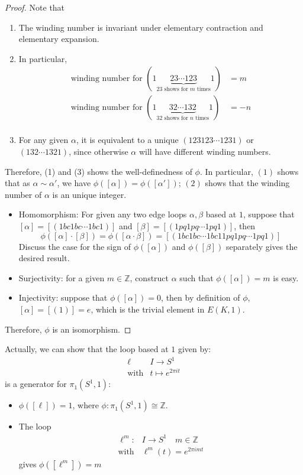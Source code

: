 \begin{proof}
Note that
\begin{enumerate}
\item
The winding number is invariant under elementary contraction and elementary expansion.
\item
In particular,
\begin{align*}
\text{winding number for }(1\underbrace{23\cdots123}_{23 \text{ shows for $m$ times}}1)&=m\\
\text{winding number for }(1\underbrace{32\cdots132}_{32 \text{ shows for $n$ times}}1)&=-n\\
\end{align*}
\item
For any given $\alpha$, it is equivalent to a unique $(123123\cdots1231)$ or $(132\cdots1321)$, since otherwise $\alpha$ will have different winding numbers.
\end{enumerate}
Therefore, (1) and (3) shows the well-definedness of $\phi$. In particular, $(1)$ shows that as $\alpha\sim\alpha'$, we have $\phi([\alpha])=\phi([\alpha'])$; $(2)$ shows that the winding number of $\alpha$ is an unique integer.
\begin{itemize}
\item
Homomorphism:
For given any two edge loops $\alpha,\beta$ based at $1$, suppose that $[\alpha]=[(1bc1bc\cdots1bc1)]$ and $[\beta]=[(1pq1pq\cdots1pq1)]$, then
\[
\phi([\alpha]\cdot[\beta])=\phi([\alpha\cdot\beta])
=
[(1bc1bc\cdots1bc11pq1pq\cdots1pq1)]
\]
Discuss the case for the sign of $\phi([\alpha])$ and $\phi([\beta])$ separately gives the desired result.
\item
Surjectivity:
for a given $m\in\mathbb{Z}$,
construct $\alpha$ such that $\phi([\alpha])=m$ is easy.
\item
Injectivity:
suppose that $\phi([\alpha])=0$, then by definition of $\phi$, $[\alpha]=[(1)]=e$, which is the trivial element in $E(K,1)$.
\end{itemize}
Therefore, $\phi$ is an isomorphism.
\end{proof}

\begin{remark}
Actually, we can show that the loop based at $1$ given by:
\[
\begin{array}{ll}
\ell&I\to S^1\\\text{with}&t\mapsto e^{2\pi i t}
\end{array}
\]
is a generator for $\pi_1(S^1,1)$:
\begin{itemize}
\item
$\phi([\ell])=1$, where $\phi:\pi_1(S^1,1)\cong\mathbb{Z}$.
\item
The loop
\[
\begin{array}{ll}
\ell^m:&I\to S^1\quad m\in\mathbb{Z}\\
\text{with}&\ell^m(t) = e^{2\pi imt}
\end{array}
\]
gives $\phi([\ell^m])=m$
\end{itemize}
\end{remark}

